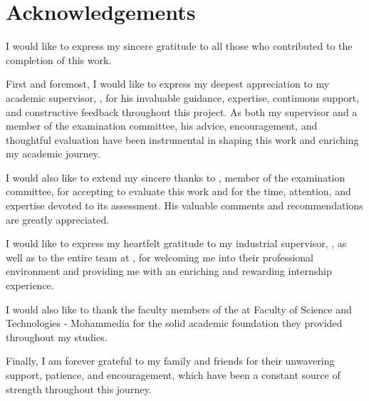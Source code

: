 
\chapter*{Acknowledgements}

\vspace{1em}

I would like to express my sincere gratitude to all those who contributed to
the completion of this work.

\bigskip

First and foremost, I would like to express my deepest appreciation to my academic supervisor, 
\textbf{\JuryPresidentName}, for his invaluable guidance, expertise, continuous support,
and constructive feedback throughout this project. As both my supervisor and a member of the examination committee, his advice, encouragement, and thoughtful evaluation have been instrumental in shaping this work and enriching my academic journey.


\bigskip

I would also like to extend my sincere thanks to \textbf{\JuryMemberOneName},
 member of the examination committee, for accepting to evaluate this work and for the time, 
 attention, and expertise devoted to its assessment. His valuable comments and recommendations
  are greatly appreciated.


\bigskip
I would like to express my heartfelt gratitude to my industrial supervisor, \textbf{\IndustrialSupervisorName}, 
as well as to the entire team at \textbf{\CompanyName}  , for welcoming me into their professional environment
 and providing me with an enriching and rewarding internship experience. 


\bigskip

I would also like to thank the faculty members of the \textbf{\DepartmentName} at
Faculty of Science and Technologies - Mohammedia for the solid academic foundation they provided throughout my studies.

\bigskip

Finally, I am forever grateful to my family and friends for their unwavering support, 
patience, and encouragement, which have been a constant source of strength throughout this journey.
\vspace{2em}
\begin{flushright}
  \AuthorFullName\\
  \ReportDate
\end{flushright}
